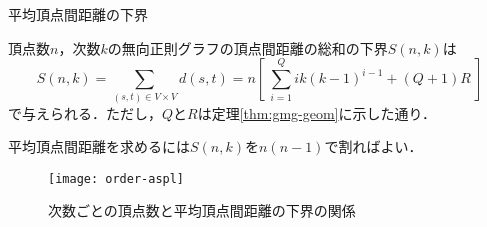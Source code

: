 \begin{frame}{平均頂点間距離の下界}
  \begin{theorem}\rm\scriptsize
    \label{thm:gmg-lower-bound}
    頂点数$n$，次数$k$の無向正則グラフの頂点間距離の総和の下界$S(n,k)$は
    \[
    S(n,k) = \sum_{(s,t)\in V\times V}d(s,t) =
    n \left[\ \sum^{Q}_{i=1}ik(k-1)^{i-1} + (Q+1)R\ \right]
    \]
    で与えられる．ただし，$Q$と$R$は定理\ref{thm:gmg-geom}に示した通り．
  \end{theorem}
  \par{\small 平均頂点間距離を求めるには$S(n,k)$を$n(n-1)$で割ればよい．}
  \begin{figure}
    \texttt{[image: order-aspl]}
    \caption{次数ごとの頂点数と平均頂点間距離の下界の関係}
  \end{figure}
  \vfill
\end{frame}

